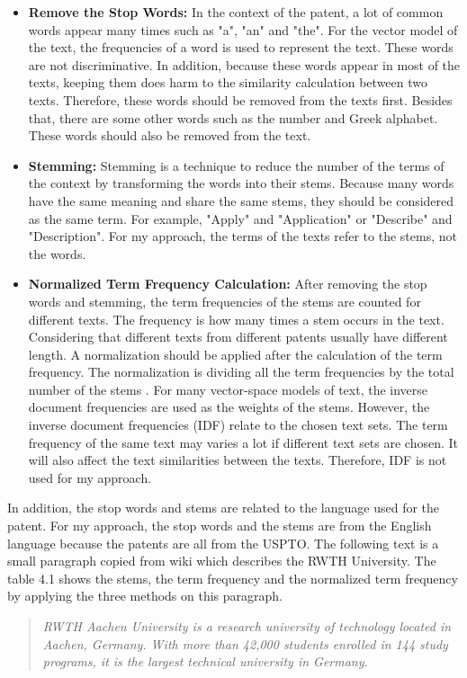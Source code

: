 \begin{itemize}
\item  \textbf{Remove the Stop Words:} In the context of the patent, a lot of common words appear many times such as "a", "an" and "the". For the vector model of the text, the frequencies of a word is used to represent the text. These words are not discriminative. In addition, because these words appear in most of the texts, keeping them does harm to the similarity calculation between two texts. Therefore, these words should be removed from the texts first. Besides that, there are some other words such as the number and Greek alphabet. These words should also be removed from the text.
 
\item  \textbf{Stemming:} Stemming is a technique to reduce the number of the terms of the context by transforming the words into their stems. Because many words have the same meaning and share the same stems, they should be considered as the same term. For example, "Apply" and "Application" or "Describe" and "Description". For my approach, the terms of the texts refer to the stems, not the words. 
 
\item  \textbf{Normalized Term Frequency Calculation:} After removing the stop words and stemming, the term frequencies of the stems are counted for different texts. The frequency is how many times a stem occurs in the text. Considering that different texts from different patents usually have different length. A normalization should be applied after the calculation of the term frequency. The normalization is dividing all the term frequencies by the total number of the stems . For many vector-space models of text, the inverse document frequencies are used as the weights of the stems. However, the inverse document frequencies (IDF) relate to the chosen text sets. The term frequency of the same text may varies a lot if different text sets are chosen. It will also affect the text similarities between the texts. Therefore, IDF is not used for my approach.
\end{itemize}

In addition, the stop words and stems are related to the language used for the patent. For my approach, the stop words and the stems are from the English language because the patents are all from the USPTO. The following text is a small paragraph copied from wiki which describes the RWTH University. The table 4.1 shows the stems, the term frequency and the normalized term frequency by applying the three methods on this paragraph.
\begin{quotation}
\emph{RWTH Aachen University is a research university of technology located in Aachen, Germany. With more than 42,000 students enrolled in 144 study programs, it is the largest technical university in Germany.}
\end{quotation}

